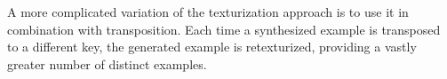
A more complicated variation of the texturization approach
is to use it in combination with transposition. Each time a
synthesized example is transposed to a different key, the
generated example is retexturized, providing a vastly
greater number of distinct examples.
